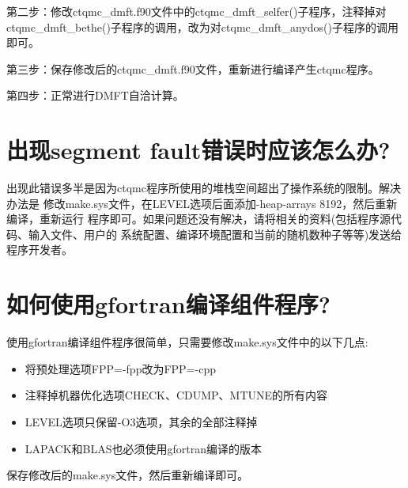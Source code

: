 {第二步：修改ctqmc\_dmft.f90文件中的ctqmc\_dmft\_selfer()子程序，注释掉对
ctqmc\_dmft\_bethe()子程序的调用，改为对ctqmc\_dmft\_anydos()子程序的调用即可。

第三步：保存修改后的ctqmc\_dmft.f90文件，重新进行编译产生ctqmc程序。

第四步：正常进行DMFT自洽计算。

\section{出现segment fault错误时应该怎么办?}
\label{app:seg}

出现此错误多半是因为ctqmc程序所使用的堆栈空间超出了操作系统的限制。解决办法是
修改make.sys文件，在LEVEL选项后面添加-heap-arrays 8192，然后重新编译，重新运行
程序即可。如果问题还没有解决，请将相关的资料(包括程序源代码、输入文件、用户的
系统配置、编译环境配置和当前的随机数种子等等)发送给程序开发者。

\section{如何使用gfortran编译\iqist 组件程序?}
\label{app:gfortran}

使用gfortran编译\iqist 组件程序很简单，只需要修改make.sys文件中的以下几点:
\begin{itemize}
  \item 将预处理选项FPP=-fpp改为FPP=-cpp
  \item 注释掉机器优化选项CHECK、CDUMP、MTUNE的所有内容
  \item LEVEL选项只保留-O3选项，其余的全部注释掉
  \item LAPACK和BLAS也必须使用gfortran编译的版本
\end{itemize}

保存修改后的make.sys文件，然后重新编译即可。
}
